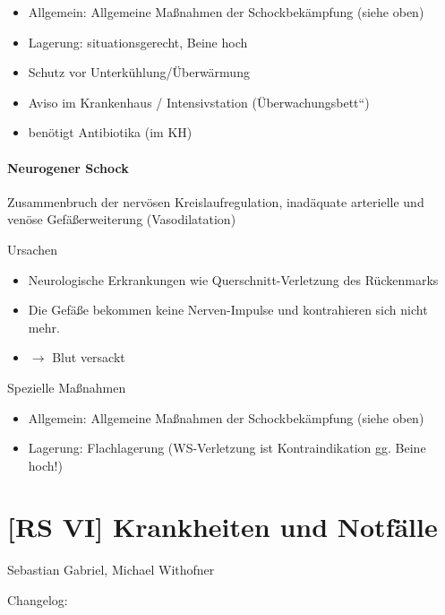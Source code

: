\documentclass{article}
\begin{document}
\begin{itemize}
\item Allgemein: Allgemeine Ma{\ss}nahmen der Schockbek\"ampfung (siehe
oben) 

\item Lagerung: situationsgerecht, Beine hoch

\item Schutz vor Unterk\"uhlung/\"Uberw\"armung

\item Aviso im Krankenhaus / Intensivstation
({\quotedblbase}\"Uberwachungsbett{\textquotedblleft})

\item ben\"otigt Antibiotika (im KH)

\end{itemize}
\paragraph{Neurogener Schock}
Zusammenbruch der nerv\"osen Kreislaufregulation, inad\"aquate
arterielle und ven\"ose Gef\"a{\ss}erweiterung (Vasodilatation)

Ursachen 

\begin{itemize}
\item Neurologische Erkrankungen wie Querschnitt-Verletzung des
R\"uckenmarks

\item Die Gef\"a{\ss}e bekommen keine Nerven-Impulse und kontrahieren
sich nicht mehr.

\item ${\rightarrow}$ Blut versackt

\end{itemize}
Spezielle Ma{\ss}nahmen

\begin{itemize}
\item Allgemein: Allgemeine Ma{\ss}nahmen der Schockbek\"ampfung (siehe
oben) 

\item Lagerung: Flachlagerung (WS-Verletzung ist Kontraindikation gg.
Beine hoch!)

\end{itemize}
\section{[RS VI] Krankheiten und Notf\"alle}
Sebastian Gabriel, Michael Withofner

Changelog:
\end{document}
